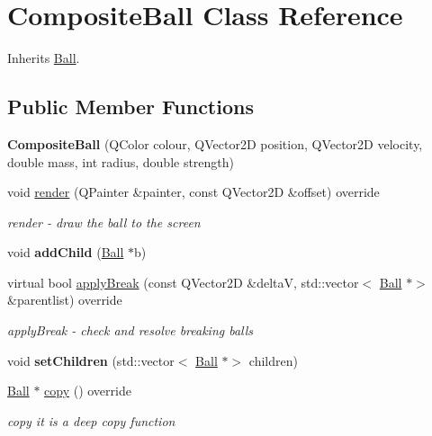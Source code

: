 \hypertarget{class_composite_ball}{}\section{Composite\+Ball Class Reference}
\label{class_composite_ball}


Inherits \mbox{\hyperlink{class_ball}{Ball}}.

\subsection*{Public Member Functions}
\begin{DoxyCompactItemize}
\item 
\mbox{\label{class_composite_ball_a7b6224c07ad69240377555508ddc8876}} 
{\bfseries Composite\+Ball} (Q\+Color colour, Q\+Vector2D position, Q\+Vector2D velocity, double mass, int radius, double strength)
\item 
void \mbox{\hyperlink{class_composite_ball_a2aefe32771e1cde5dc8f51d779c880eb}{render}} (Q\+Painter \&painter, const Q\+Vector2D \&offset) override
\begin{DoxyCompactList}\small\item\em render -\/ draw the ball to the screen \end{DoxyCompactList}\item 
\mbox{\label{class_composite_ball_a6c226ee364012b0c3eb3271a01307297}} 
void {\bfseries add\+Child} (\mbox{\hyperlink{class_ball}{Ball}} $\ast$b)
\item 
virtual bool \mbox{\hyperlink{class_composite_ball_a0da2c5749caafcef943f14a500a0fc9b}{apply\+Break}} (const Q\+Vector2D \&deltaV, std\+::vector$<$ \mbox{\hyperlink{class_ball}{Ball}} $\ast$$>$ \&parentlist) override
\begin{DoxyCompactList}\small\item\em apply\+Break -\/ check and resolve breaking balls \end{DoxyCompactList}\item 
\mbox{\label{class_composite_ball_ab819946774bc42cf5a932ccaecb75e9e}} 
void {\bfseries set\+Children} (std\+::vector$<$ \mbox{\hyperlink{class_ball}{Ball}} $\ast$$>$ children)
\item 
\mbox{\hyperlink{class_ball}{Ball}} $\ast$ \mbox{\hyperlink{class_composite_ball_ad00585e160c3b030435d567141574fd2}{copy}} () override
\begin{DoxyCompactList}\small\item\em copy it is a deep copy function \end{DoxyCompactList}\end{DoxyCompactItemize}
